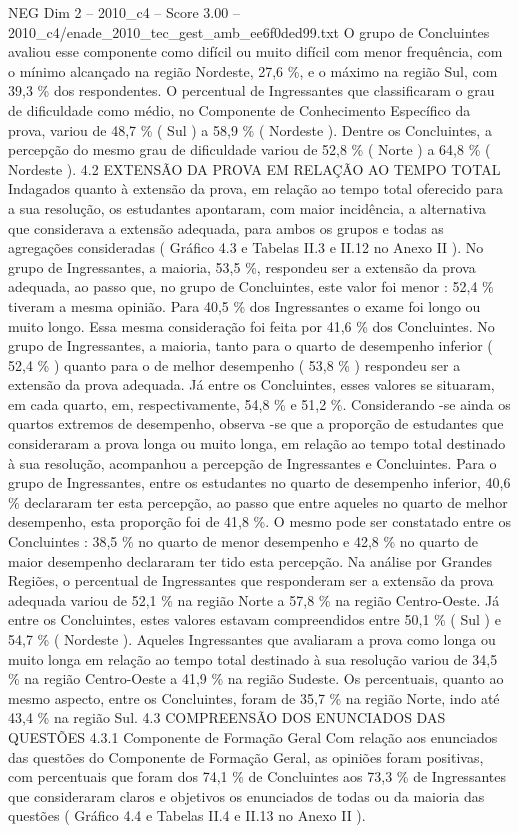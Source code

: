 \begin{textsample}{NEG Dim 2 – 2010\_c4 – Score 3.00 – 2010\_c4/enade\_2010\_tec\_gest\_amb\_ee6f0ded99.txt}
O grupo de Concluintes avaliou esse componente como difícil ou muito difícil com menor frequência, com o mínimo alcançado na região Nordeste, 27,6 \%, e o máximo na região Sul, com 39,3 \% dos respondentes.
O percentual de Ingressantes que classificaram o grau de dificuldade como médio, no Componente de Conhecimento Específico da prova, variou de 48,7 \% ( Sul ) a 58,9 \% ( Nordeste ).
Dentre os Concluintes, a percepção do mesmo grau de dificuldade variou de 52,8 \% ( Norte ) a 64,8 \% ( Nordeste ). 4.2 EXTENSÃO DA PROVA EM RELAÇÃO AO TEMPO TOTAL Indagados quanto à extensão da prova, em relação ao tempo total oferecido para a sua resolução, os estudantes apontaram, com maior incidência, a alternativa que considerava a extensão adequada, para ambos os grupos e todas as agregações consideradas ( Gráfico 4.3 e Tabelas II.3 e II.12 no Anexo II ).
No grupo de Ingressantes, a maioria, 53,5 \%, respondeu ser a extensão da prova adequada, ao passo que, no grupo de Concluintes, este valor foi menor : 52,4 \% tiveram a mesma opinião.
Para 40,5 \% dos Ingressantes o exame foi longo ou muito longo.
Essa mesma consideração foi feita por 41,6 \% dos Concluintes.
No grupo de Ingressantes, a maioria, tanto para o quarto de desempenho inferior ( 52,4 \% ) quanto para o de melhor desempenho ( 53,8 \% ) respondeu ser a extensão da prova adequada.
Já entre os Concluintes, esses valores se situaram, em cada quarto, em, respectivamente, 54,8 \% e 51,2 \%.
Considerando -se ainda os quartos extremos de desempenho, observa -se que a proporção de estudantes que consideraram a prova longa ou muito longa, em relação ao tempo total destinado à sua resolução, acompanhou a percepção de Ingressantes e Concluintes.
Para o grupo de Ingressantes, entre os estudantes no quarto de desempenho inferior, 40,6 \% declararam ter esta percepção, ao passo que entre aqueles no quarto de melhor desempenho, esta proporção foi de 41,8 \%.
O mesmo pode ser constatado entre os Concluintes : 38,5 \% no quarto de menor desempenho e 42,8 \% no quarto de maior desempenho declararam ter tido esta percepção.
Na análise por Grandes Regiões, o percentual de Ingressantes que responderam ser a extensão da prova adequada variou de 52,1 \% na região Norte a 57,8 \% na região Centro-Oeste.
Já entre os Concluintes, estes valores estavam compreendidos entre 50,1 \% ( Sul ) e 54,7 \% ( Nordeste ).
Aqueles Ingressantes que avaliaram a prova como longa ou muito longa em relação ao tempo total destinado à sua resolução variou de 34,5 \% na região Centro-Oeste a 41,9 \% na região Sudeste.
Os percentuais, quanto ao mesmo aspecto, entre os Concluintes, foram de 35,7 \% na região Norte, indo até 43,4 \% na região Sul. 4.3 COMPREENSÃO DOS ENUNCIADOS DAS QUESTÕES 4.3.1 Componente de Formação Geral Com relação aos enunciados das questões do Componente de Formação Geral, as opiniões foram positivas, com percentuais que foram dos 74,1 \% de Concluintes aos 73,3 \% de Ingressantes que consideraram claros e objetivos os enunciados de todas ou da maioria das questões ( Gráfico 4.4 e Tabelas II.4 e II.13 no Anexo II ).

\end{textsample}
